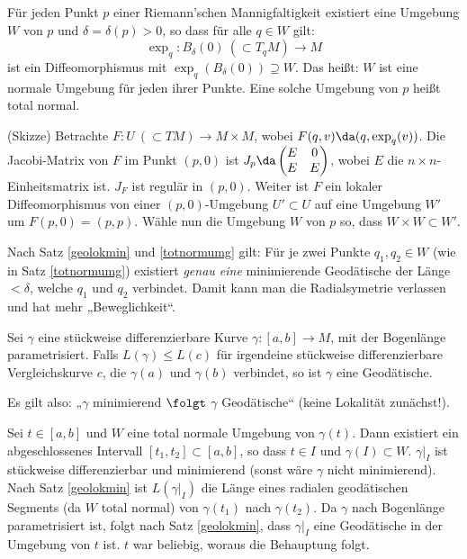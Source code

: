 \documentclass[a4paper,twoside,DIV15,BCOR12mm]{scrbook}
\begin{document}
\begin{satz}
\label{totnormumg}
Für jeden Punkt $p$ einer Riemann’schen Mannigfaltigkeit existiert eine Umgebung $W$ von $p$ und $\delta = \delta(p)>0$, so dass für alle $q\in W$ gilt:
\[
\exp_q : B_\delta(0)\ (\subset T_qM) \to M
\]
ist ein Diffeomorphismus mit $\exp_q (B_\delta(0)) \supseteq W$. Das heißt: $W$ ist eine normale Umgebung für jeden ihrer Punkte. Eine solche Umgebung von $p$ heißt total normal.
\end{satz}

\begin{beweis}
(Skizze) Betrachte $F:U\ (\subset TM)\to M\times M$, wobei $F(q,v) \da (q,\exp_q(v))$. Die Jacobi-Matrix von $F$ im Punkt $(p,0)$ ist $J_p \da \begin{pmatrix} E & 0 \\ E & E \end{pmatrix}$, wobei $E$ die $n\times n$-Einheitsmatrix ist. $J_F$ ist regulär in $(p,0)$. Weiter ist $F$ ein lokaler Diffeomorphismus von einer $(p,0)$-Umgebung $U'\subset U$ auf eine Umgebung $W'$ um $F(p,0) = (p,p)$. Wähle nun die Umgebung $W$ von $p$ so, dass $W\times W\subset W'$.
\end{beweis}

\begin{bemerkung}
Nach Satz \ref{geolokmin} und \ref{totnormumg} gilt: Für je zwei Punkte $q_1,q_2\in W$ (wie in Satz \ref{totnormumg}) existiert \emph{genau eine} minimierende Geodätische der Länge $<\delta$, welche $q_1$ und $q_2$ verbindet. Damit kann man die Radialsymetrie verlassen und hat mehr „Beweglichkeit“.
\end{bemerkung}

\begin{korrolar}
Sei $\gamma$ eine stückweise differenzierbare Kurve $\gamma:[a,b]\to M$, mit der Bogenlänge parametrisiert. Falls $L(\gamma) \le L(c)$ für irgendeine
stückweise differenzierbare Vergleichskurve $c$, die $\gamma(a)$ und $\gamma(b)$ verbindet, so ist $\gamma$ eine Geodätische.

Es gilt also: „$\gamma$ minimierend $\folgt$ $\gamma$ Geodätische“ (keine Lokalität zunächst!).
\end{korrolar}

\begin{beweis}
Sei $t\in[a,b]$ und $W$ eine total normale Umgebung von $\gamma(t)$. Dann existiert ein abgeschlossenes Intervall $[t_1,t_2] \subset [a,b]$, so dass $t\in I$ und $\gamma(I)\subset W$. $\gamma|_I$ ist stückweise differenzierbar und minimierend (sonst wäre $\gamma$ nicht minimierend). Nach Satz \ref{geolokmin} ist $L(\gamma|_I)$ die Länge eines radialen geodätischen Segments (da $W$ total normal) von $\gamma(t_1)$ nach $\gamma(t_2)$. Da $\gamma$ nach Bogenlänge parametrisiert ist, folgt nach Satz \ref{geolokmin}, dass $\gamma|_I$ eine Geodätische in der Umgebung von $t$ ist. $t$ war beliebig, woraus die Behauptung folgt.
\end{beweis}
\end{document}
